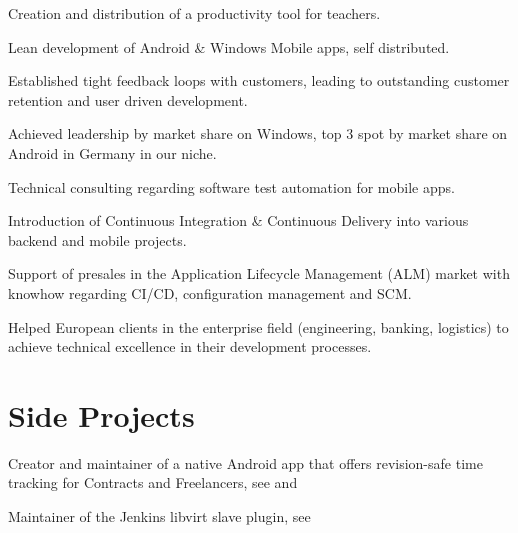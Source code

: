 \documentclass[]{resume}
\begin{document}
\begin{minipage}[t]{0.64\textwidth}
\begin{tightemize}
\item Creation and distribution of a productivity tool for teachers.
\item Lean development of Android \& Windows Mobile apps, self distributed.
\item Established tight feedback loops with customers, leading to outstanding customer retention and user driven development.
\item Achieved leadership by market share on Windows, top 3 spot by market share on Android in Germany in our niche.
\end{tightemize}
\sectionsep

\begin{tightemize}
\item Technical consulting regarding software test automation for mobile apps.
\item Introduction of Continuous Integration \& Continuous Delivery into various backend and mobile projects.
\item Support of presales in the Application Lifecycle Management (ALM) market with knowhow regarding CI/CD, configuration management and SCM.
\item Helped European clients in the enterprise field (engineering, banking, logistics) to achieve technical excellence in their development processes.
\end{tightemize}
\sectionsep



\section{Side Projects}

Creator and maintainer of a native Android app that offers revision-safe time tracking for Contracts and Freelancers, see \href{https://github.com/tastybug/timetracker}{} and \href{https://play.google.com/store/apps/details?id=com.tastybug.timetracker}{}
\sectionsep

Maintainer of the Jenkins libvirt slave plugin, see \href{https://wiki.jenkins.io/display/JENKINS/Libvirt+Slaves+Plugin}{}
\sectionsep

\end{minipage} 
\end{document}
